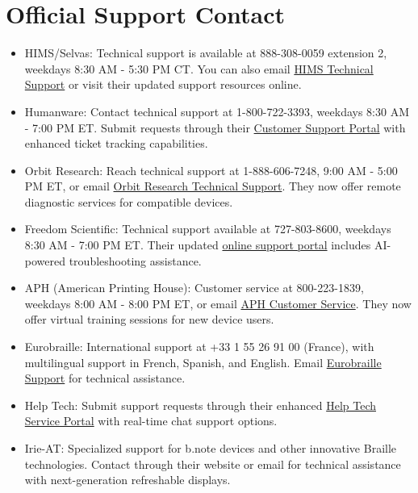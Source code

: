 \section{Official Support Contact}\label{report2}
\begin{itemize}
 \item HIMS/Selvas: Technical support is available at 888-308-0059 extension 2, weekdays 8:30 AM - 5:30 PM CT. You can also email \href{mailto:support@hims-inc.com}{HIMS Technical Support} or visit their updated support resources online.

 \item Humanware: Contact technical support at 1-800-722-3393, weekdays 8:30 AM - 7:00 PM ET. Submit requests through their \href{https://store.humanware.com/hus/contact/}{Customer Support Portal} with enhanced ticket tracking capabilities.

 \item Orbit Research: Reach technical support at 1-888-606-7248, 9:00 AM - 5:00 PM ET, or email \href{mailto:techsupport@orbitresearch.com}{Orbit Research Technical Support}. They now offer remote diagnostic services for compatible devices.

 \item Freedom Scientific: Technical support available at 727-803-8600, weekdays 8:30 AM - 7:00 PM ET. Their updated \href{https://support.freedomscientific.com/Forms/TechSupport}{online support portal} includes AI-powered troubleshooting assistance.

 \item APH (American Printing House): Customer service at 800-223-1839, weekdays 8:00 AM - 8:00 PM ET, or email \href{mailto:cs@aph.org}{APH Customer Service}. They now offer virtual training sessions for new device users.

 \item Eurobraille: International support at +33 1 55 26 91 00 (France), with multilingual support in French, Spanish, and English. Email \href{mailto:contact@eurobraille.fr}{Eurobraille Support} for technical assistance.

 \item Help Tech: Submit support requests through their enhanced \href{https://www.help-tech.com/contact}{Help Tech Service Portal} with real-time chat support options.

 \item Irie-AT: Specialized support for b.note devices and other innovative Braille technologies. Contact through their website or email for technical assistance with next-generation refreshable displays.
\end{itemize}


